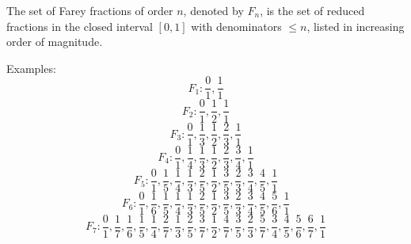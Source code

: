 The set of Farey fractions of order $n$, denoted by $F_n$, is the set of reduced fractions in the closed interval $[0, 1]$ with denominators $\leq n$, listed in increasing order of magnitude.

Examples:
$$F_1: \frac{0}{1}, \frac{1}{1}$$
$$F_2: \frac{0}{1}, \frac{1}{2}, \frac{1}{1}$$
$$F_3: \frac{0}{1}, \frac{1}{3}, \frac{1}{2}, \frac{2}{3}, \frac{1}{1}$$
$$F_4: \frac{0}{1}, \frac{1}{4}, \frac{1}{3}, \frac{1}{2}, \frac{2}{3}, \frac{3}{4}, \frac{1}{1}$$
$$F_5: \frac{0}{1}, \frac{1}{5}, \frac{1}{4}, \frac{1}{3}, \frac{2}{5}, \frac{1}{2}, \frac{3}{5}, \frac{2}{3}, \frac{3}{4}, \frac{4}{5}, \frac{1}{1}$$
$$F_6: \frac{0}{1}, \frac{1}{6}, \frac{1}{5}, \frac{1}{4}, \frac{1}{3}, \frac{2}{5}, \frac{1}{2}, \frac{3}{5}, \frac{2}{3}, \frac{3}{4}, \frac{4}{5}, \frac{5}{6}, \frac{1}{1}$$
$$F_7: \frac{0}{1}, \frac{1}{7}, \frac{1}{6}, \frac{1}{5}, \frac{1}{4}, \frac{2}{7}, \frac{1}{3}, \frac{2}{5}, \frac{3}{7}, \frac{1}{2}, \frac{4}{7}, \frac{3}{5}, \frac{2}{3}, \frac{5}{7}, \frac{3}{4}, \frac{4}{5}, \frac{5}{6}, \frac{6}{7}, \frac{1}{1}$$
